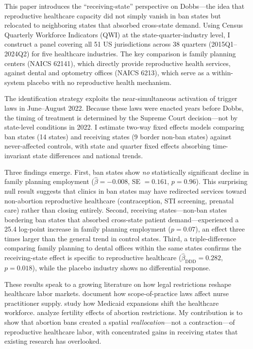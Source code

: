 \documentclass[12pt]{article}
\begin{document}
This paper introduces the ``receiving-state'' perspective on Dobbs---the idea that reproductive healthcare capacity did not simply vanish in ban states but relocated to neighboring states that absorbed cross-state demand. Using Census Quarterly Workforce Indicators (QWI) at the state-quarter-industry level, I construct a panel covering all 51 US jurisdictions across 38 quarters (2015Q1--2024Q2) for five healthcare industries. The key comparison is family planning centers (NAICS 62141), which directly provide reproductive health services, against dental and optometry offices (NAICS 6213), which serve as a within-system placebo with no reproductive health mechanism.

The identification strategy exploits the near-simultaneous activation of trigger laws in June--August 2022. Because these laws were enacted years before Dobbs, the timing of treatment is determined by the Supreme Court decision---not by state-level conditions in 2022. I estimate two-way fixed effects models comparing ban states (14 states) and receiving states (9 border non-ban states) against never-affected controls, with state and quarter fixed effects absorbing time-invariant state differences and national trends.

Three findings emerge. First, ban states show \textit{no} statistically significant decline in family planning employment ($\hat{\beta} = -0.008$, SE $= 0.161$, $p = 0.96$). This surprising null result suggests that clinics in ban states may have redirected services toward non-abortion reproductive healthcare (contraception, STI screening, prenatal care) rather than closing entirely. Second, receiving states---non-ban states bordering ban states that absorbed cross-state patient demand---experienced a 25.4 log-point increase in family planning employment ($p = 0.07$), an effect three times larger than the general trend in control states. Third, a triple-difference comparing family planning to dental offices within the same states confirms the receiving-state effect is specific to reproductive healthcare ($\hat{\beta}_{\text{DDD}} = 0.282$, $p = 0.018$), while the placebo industry shows no differential response.

These results speak to a growing literature on how legal restrictions reshape healthcare labor markets. \citet{buchmueller2020} document how scope-of-practice laws affect nurse practitioner supply. \citet{markowitz2017} study how Medicaid expansions shift the healthcare workforce. \citet{joycekaestrner2024} analyze fertility effects of abortion restrictions. My contribution is to show that abortion bans created a spatial \textit{reallocation}---not a contraction---of reproductive healthcare labor, with concentrated gains in receiving states that existing research has overlooked.
\end{document}
